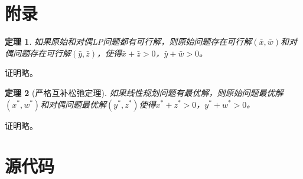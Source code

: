 \documentclass{ctexart}
\numberwithin{equation}{section} %
\newtheorem{theorem}{定理}[section]
\begin{document}
\appendix
\section{附录}
\begin{theorem}
	\label{th:  SCST}
	如果原始和对偶LP问题都有可行解，则原始问题存在可行解$ \left(\bar{x}, \bar{w}\right) $和对偶问题存在可行解$ \left(\bar{y}, \bar{z}\right) $，使得$ \bar{x} + \bar{z} > 0 $，$ \bar{y} + \bar{w} > 0 $。
\end{theorem}

证明略。
\begin{theorem}[严格互补松弛定理]
	如果线性规划问题有最优解，则原始问题最优解$ \left(x^*, w^*\right) $和对偶问题最优解$ \left(y^*, z^*\right) $使得$ x^* + z^* > 0 $，$ y^* + w^* > 0 $。
\end{theorem}

证明略。

\section{源代码}





\end{document}
